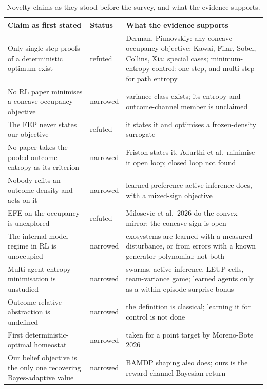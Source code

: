\documentclass[10pt]{article}
\begin{document}
\begin{table}[h]
\centering
\footnotesize
\begin{tabularx}{\textwidth}{@{}p{}lX@{}}
\toprule
Claim as first stated & Status & What the evidence supports \\
\midrule
Only single-step proofs of a deterministic optimum exist & refuted & Derman, Piunovskiy: any concave occupancy objective; Kawai, Filar, Sobel, Collins, Xia: special cases; minimum-entropy control: one step, and multi-step for path entropy \citep{vanZutphen-predictable24} \\
No RL paper minimises a concave occupancy objective & narrowed & variance class exists; its entropy and outcome-channel member is unclaimed \\
The FEP never states our objective & refuted & it states it and optimises a frozen-density surrogate \\
No paper takes the pooled outcome entropy as its criterion & narrowed & Friston states it, Adurthi et al.\ minimise it open loop; closed loop not found \\
Nobody refits an outcome density and acts on it & narrowed & learned-preference active inference does, with a mixed-sign objective \\
EFE on the occupancy is unexplored & refuted & Milosevic et al.\ 2026 do the convex mirror; the concave sign is open \\
The internal-model regime in RL is unoccupied & narrowed & exosystems are learned with a measured disturbance, or from errors with a known generator polynomial; not both \\
Multi-agent entropy minimisation is unstudied & narrowed & swarms, active inference, LEUP cells, team-variance game; learned agents only as a within-episode surprise bonus \\
Outcome-relative abstraction is undefined & narrowed & the definition is classical; learning it for control is not done \\
First deterministic-optimal homeostat & narrowed & taken for a point target by Moreno-Bote 2026 \\
Our belief objective is the only one recovering Bayes-adaptive value & narrowed & BAMDP shaping also does; ours is the reward-channel Bayesian return \\
\bottomrule
\end{tabularx}
\caption{Novelty claims as they stood before the survey, and what the evidence supports.}
\label{tab:claims}
\end{table}
\end{document}
